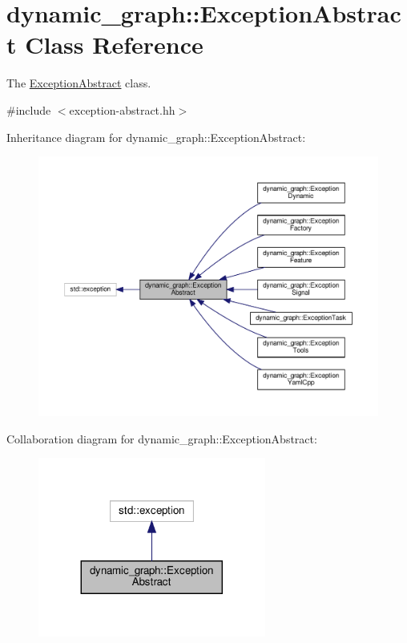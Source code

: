 \hypertarget{classdynamic__graph_1_1ExceptionAbstract}{}\section{dynamic\+\_\+graph\+:\+:Exception\+Abstract Class Reference}
\label{classdynamic__graph_1_1ExceptionAbstract}


The \hyperlink{classdynamic__graph_1_1ExceptionAbstract}{Exception\+Abstract} class.  




{\ttfamily \#include $<$exception-\/abstract.\+hh$>$}



Inheritance diagram for dynamic\+\_\+graph\+:\+:Exception\+Abstract\+:
\nopagebreak
\begin{figure}[H]
\begin{center}
\leavevmode
\includegraphics[width=350pt]{classdynamic__graph_1_1ExceptionAbstract__inherit__graph}
\end{center}
\end{figure}


Collaboration diagram for dynamic\+\_\+graph\+:\+:Exception\+Abstract\+:
\nopagebreak
\begin{figure}[H]
\begin{center}
\leavevmode
\includegraphics[width=212pt]{classdynamic__graph_1_1ExceptionAbstract__coll__graph}
\end{center}
\end{figure}

